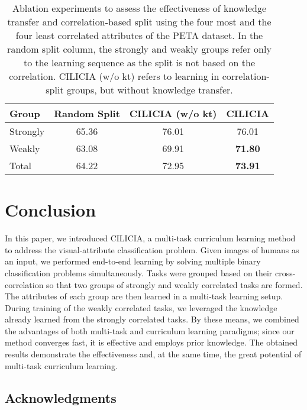 \documentclass[10pt,twocolumn,letterpaper]{article}
\begin{document}
	\begin{table}[t]
		\centering
		\caption{Ablation experiments to assess the effectiveness of knowledge transfer and correlation-based split using the four most and the four least correlated attributes of the PETA dataset. In the random split column, the strongly and weakly groups refer only to the learning sequence as the split is not based on the correlation. CILICIA (w/o kt) refers to learning in correlation-split groups, but without knowledge transfer.}
		\small    
		\begin{tabular}{l c c c}
			\toprule
			Group  & Random Split & CILICIA (w/o kt) & CILICIA\\
			\midrule
			Strongly & 65.36 & 76.01 & 76.01 \\
			Weakly & 63.08 & 69.91 & \textbf{71.80}\\
			Total & 64.22 & 72.95 & \textbf{73.91}\\
			\bottomrule
		\end{tabular}%
		\label{tab:Abl1}%
	\end{table}%
	
	\section{Conclusion}
	In this paper, we introduced CILICIA, a multi-task curriculum learning method to address the visual-attribute classification problem. Given images of humans as an input, we performed end-to-end learning by solving multiple binary classification problems simultaneously. Tasks were grouped based on their cross-correlation so that two groups of strongly and weakly correlated tasks are formed. The attributes of each group are then learned in a multi-task learning setup. During training of the weakly correlated tasks, we leveraged the knowledge already learned from the strongly correlated tasks. By these means, we combined the advantages of both multi-task and curriculum learning paradigms; since our method converges fast, it is effective and employs prior knowledge. The obtained results demonstrate the effectiveness and, at the same time, the great potential of multi-task curriculum learning. 
	\subsection*{Acknowledgments}
	\clearpage{\small
		
		
	}
	\clearpage
	
	
\end{document}
